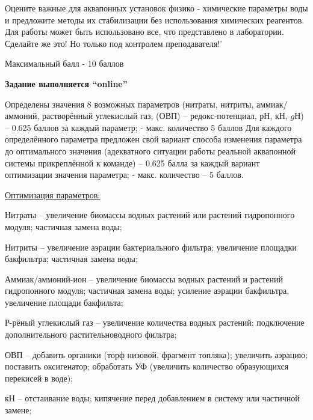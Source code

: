 
Оцените важные для аквапонных установок физико - химические параметры воды и предложите методы их стабилизации без использования химических реагентов. Для работы может быть использовано все, что представлено в лаборатории.
Сделайте же это!  
Но только под контролем преподавателя!' 

Максимальный балл - 10 баллов

\textbf{Задание выполняется “online”}

\markSection

Определены значения 8 возможных параметров (нитраты, нитриты, аммиак/аммоний, растворённый  углекислый газ, (ОВП) – редокс-потенциал, $рН$, $кН$, $gН$) – 0.625 баллов за каждый параметр; - макс. количество 5 баллов
Для каждого определённого параметра предложен свой вариант способа изменения параметра до оптимального значения (адекватного ситуации работы реальной аквапонной системы прикреплённой к команде) – 0.625 балла за каждый вариант оптимизации значения параметра; - макс. количество – 5 баллов.

\underline{Оптимизация параметров:}

Нитраты – увеличение биомассы водных растений или растений гидропонного модуля; частичная замена воды;

Нитриты – увеличение аэрации бактериального фильтра; увеличение площадки бакфильтра; частичная замена воды;

Аммиак/аммоний-ион – увеличение биомассы водных растений и растений гидропонного модуля; частичная замена воды; усиление аэрации бакфильтра, увеличение площади бакфильта;

Р-рёный углекислый газ – увеличение количества водных растений; подключение дополнительного растительноводного фильтра;

ОВП – добавить органики (торф низовой, фрагмент топляка); увеличить аэрацию; поставить оксигенатор; обработать УФ (увеличить количество образующихся перекисей в воде);

кН – отстаивание воды; кипячение перед добавлением в систему или частичной замене;

gН – добавить осадочные породы (известняк) для увеличения gН или топляк (коряги, сфагнум, торф) для уменьшения gН, кипячение перед частичной заменой, добавление дистиллированной воды;

рН – добавить осадочные породы (известняк) для увеличения рН или топляк (коряги, сфагнум, торф) для уменьшения рН
